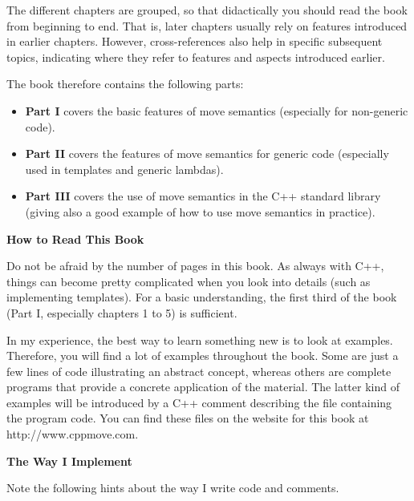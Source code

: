 The different chapters are grouped, so that didactically you should read the book from beginning to end. That is, later chapters usually rely on features introduced in earlier chapters. However, cross-references also help in specific subsequent topics, indicating where they refer to features and aspects introduced earlier.\par

The book therefore contains the following parts:\par
\begin{itemize}
	\item \textbf{Part I} covers the basic features of move semantics (especially for non-generic code).
	\item \textbf{Part II} covers the features of move semantics for generic code (especially used in templates and generic lambdas).
	\item \textbf{Part III} covers the use of move semantics in the C++ standard library (giving also a good example of how to use move semantics in practice).
\end{itemize}


\hspace*{\fill} \par %
\textbf{How to Read This Book}

Do not be afraid by the number of pages in this book. As always with C++, things can become pretty complicated when you look into details (such as implementing templates). For a basic understanding, the first third of the book (Part I, especially chapters 1 to 5) is sufficient.\par

In my experience, the best way to learn something new is to look at examples. Therefore, you will find a lot of examples throughout the book. Some are just a few lines of code illustrating an abstract concept, whereas others are complete programs that provide a concrete application of the material. The latter kind of examples will be introduced by a C++ comment describing the file containing the program code. You can find these files on the website for this book at http://www.cppmove.com.\par

\hspace*{\fill} \par %
\textbf{The Way I Implement}

Note the following hints about the way I write code and comments.\par

